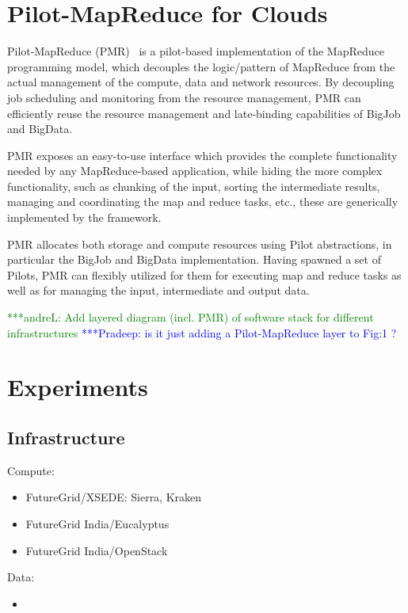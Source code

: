 \documentclass[times]{cpeauth}
\newcommand{\alnote}[1]{ {\textcolor{green} { ***andreL: #1 }}}
\newcommand{\pmnote}[1]{ {\textcolor{blue} { ***Pradeep: #1 }}}
\newcommand{\alnote}[1]{}
\newcommand{\pmnote}[1]{}
\newcommand{\pilot}{Pilot\xspace}
\newcommand{\pilots}{Pilots\xspace}
\begin{document}
\section{Pilot-MapReduce for Clouds}

Pilot-MapReduce (PMR)~\cite{Mantha:2012:PEF:2287016.2287020} is a pilot-based
implementation of the MapReduce programming model, which decouples the
logic/pattern of MapReduce from the actual management of the compute, data and
network resources. By decoupling job scheduling and monitoring from the
resource management, PMR can efficiently reuse the resource management and
late-binding capabilities of BigJob and BigData.

PMR exposes an easy-to-use interface which provides the complete
functionality needed by any MapReduce-based application, while hiding
the more complex functionality, such as chunking of the input, sorting
the intermediate results, managing and coordinating the map and reduce
tasks, etc., these are generically implemented by the
framework.

PMR allocates both storage and compute resources using \pilot abstractions, in
particular the BigJob and BigData implementation. Having spawned a set of
\pilots, PMR can flexibly utilized for them for executing map and reduce tasks
as well as for managing the input, intermediate and output data.


\alnote{Add layered diagram (incl. PMR) of software stack for different 
infrastructures}
\pmnote{ is it just adding a Pilot-MapReduce layer to Fig:1 ? }

\section{Experiments}

\subsection{Infrastructure}

Compute:
\begin{itemize}
	\item FutureGrid/XSEDE: Sierra, Kraken 
	\item FutureGrid India/Eucalyptus
	\item FutureGrid India/OpenStack
\end{itemize}

Data:
\begin{itemize}
	\item 
\end{itemize}
\end{document}
